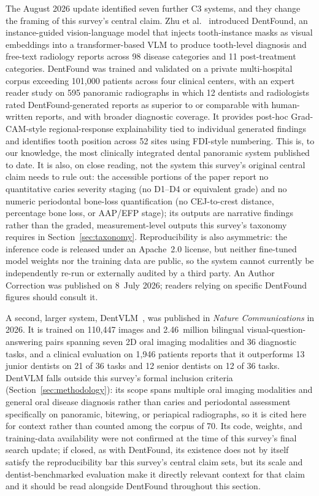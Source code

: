 \documentclass[conference]{IEEEtran}
\begin{document}
The August 2026 update identified seven further C3 systems, and they
change the framing of this survey's central claim. Zhu et
al.~\cite{zhu2026dentfound} introduced DentFound, an instance-guided
vision-language model that injects tooth-instance masks as visual
embeddings into a transformer-based VLM to produce tooth-level
diagnosis and free-text radiology reports across 98 disease categories
and 11 post-treatment categories. DentFound was trained and validated
on a private multi-hospital corpus exceeding 101,000 patients across
four clinical centers, with an expert reader study on 595 panoramic
radiographs in which 12 dentists and radiologists rated
DentFound-generated reports as superior to or comparable with
human-written reports, and with broader diagnostic coverage. It
provides post-hoc Grad-CAM-style regional-response explainability tied
to individual generated findings and identifies tooth position across
52 sites using FDI-style numbering. This is, to our knowledge, the
most clinically integrated dental panoramic system published to date.
It is also, on close reading, not the system this survey's original
central claim needs to rule out: the accessible portions of the paper
report no quantitative caries severity staging (no D1--D4 or
equivalent grade) and no numeric periodontal bone-loss quantification
(no CEJ-to-crest distance, percentage bone loss, or AAP/EFP stage);
its outputs are narrative findings rather than the graded,
measurement-level outputs this survey's taxonomy requires in
Section~\ref{sec:taxonomy}. Reproducibility is also asymmetric: the
inference code is released under an Apache~2.0 license, but neither
fine-tuned model weights nor the training data are public, so the
system cannot currently be independently re-run or externally
audited by a third party. An Author Correction was published on 8~July
2026; readers relying on specific DentFound figures should consult it.

A second, larger system, DentVLM~\cite{meng2026dentvlm}, was published
in \emph{Nature Communications} in 2026. It is trained on 110,447
images and 2.46~million bilingual visual-question-answering pairs
spanning seven 2D oral imaging modalities and 36 diagnostic tasks, and
a clinical evaluation on 1,946 patients reports that it outperforms
13 junior dentists on 21 of 36 tasks and 12 senior dentists on 12 of
36 tasks. DentVLM falls outside this survey's formal inclusion
criteria (Section~\ref{sec:methodology}): its scope spans multiple oral
imaging modalities and general oral disease diagnosis rather than
caries and periodontal assessment specifically on panoramic, bitewing,
or periapical radiographs, so it is cited here for context rather than
counted among the corpus of 70. Its code, weights, and training-data
availability were not confirmed at the time of this survey's final
search update; if closed, as with DentFound, its existence does not
by itself satisfy the reproducibility bar this survey's central claim
sets, but its scale and dentist-benchmarked evaluation make it directly
relevant context for that claim and it should be read alongside
DentFound throughout this section.
\end{document}
